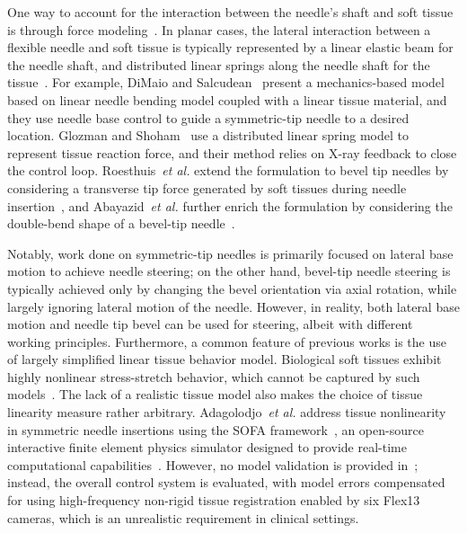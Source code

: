 One way to account for the interaction between the needle's shaft and soft tissue is through force modeling~\parencite{dimaioNeedleSteeringMotion2005,dimaioInteractiveSimulationNeedle2005,abolhassaniNeedleInsertionSoft2007,glozmanImageGuidedRoboticFlexible2007,abayazidIntegratingDeflectionModels2013,roesthuisMechanicsNeedleTissueInteraction,adagolodjoRoboticInsertionFlexible2019}. In planar cases, the lateral interaction between a flexible needle and soft tissue is typically represented by a linear elastic beam for the needle shaft, and distributed linear springs along the needle shaft for the tissue~\parencite{dimaioNeedleSteeringMotion2005,dimaioInteractiveSimulationNeedle2005,abolhassaniNeedleInsertionSoft2007,glozmanImageGuidedRoboticFlexible2007,abayazidIntegratingDeflectionModels2013}. For example, DiMaio and Salcudean~\parencite{dimaioNeedleSteeringMotion2005,dimaioInteractiveSimulationNeedle2005} present a mechanics-based model based on linear needle bending model coupled with a linear tissue material, and they use needle base control to guide a symmetric-tip needle to a desired location. Glozman and Shoham~\parencite{glozmanImageGuidedRoboticFlexible2007} use a distributed linear spring model to represent tissue reaction force, and their method relies on X-ray feedback to close the control loop. Roesthuis~\textit{et al.} extend the formulation to bevel tip needles by considering a transverse tip force generated by soft tissues during needle insertion~\cite{roesthuisMechanicsNeedleTissueInteraction}, and Abayazid~\textit{et al.} further enrich the formulation by considering the double-bend shape of a bevel-tip needle~\parencite{abayazidIntegratingDeflectionModels2013}. 

Notably, work done on symmetric-tip needles is primarily focused on lateral base motion to achieve needle steering; on the other hand, bevel-tip needle steering is typically achieved only by changing the bevel orientation via axial rotation, while largely ignoring lateral motion of the needle. However, in reality, both lateral base motion and needle tip bevel can be used for steering, albeit with different working principles. Furthermore, a common feature of previous works is the use of largely simplified linear tissue behavior model. Biological soft tissues exhibit highly nonlinear stress-stretch behavior, which cannot be captured by such models~\parencite{humphreyIntroductionBiomechanicsSolids2025,singhMechanicalPropertiesWholebody2021}. The lack of a realistic tissue model also makes the choice of tissue linearity measure rather arbitrary. Adagolodjo~\textit{et al.} address tissue nonlinearity in symmetric needle insertions using the SOFA framework~\parencite{adagolodjoRoboticInsertionFlexible2019}, an open-source interactive finite element physics simulator designed to provide real-time computational capabilities~\parencite{faureSOFAMultiModelFramework2012, coevoetSoftwareToolkitModeling2017}. However, no model validation is provided in~\parencite{adagolodjoRoboticInsertionFlexible2019}; instead, the overall control system is evaluated, with model errors compensated for using high-frequency non-rigid tissue registration enabled by six Flex13 cameras, which is an unrealistic requirement in clinical settings.

